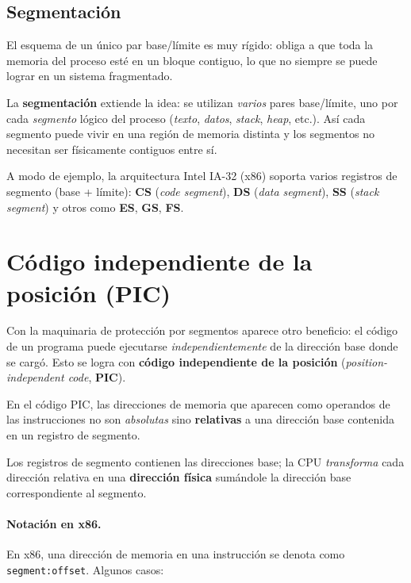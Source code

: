 \documentclass[11pt,a4paper]{article}
\begin{document}
\subsection{Segmentación}

El esquema de un único par base/límite es muy rígido: obliga a que toda
la memoria del proceso esté en un bloque contiguo, lo que no siempre se
puede lograr en un sistema fragmentado.

La \textbf{segmentación} extiende la idea: se utilizan \emph{varios}
pares base/límite, uno por cada \emph{segmento} lógico del proceso
(\emph{texto}, \emph{datos}, \emph{stack}, \emph{heap}, etc.). Así cada
segmento puede vivir en una región de memoria distinta y los segmentos
no necesitan ser físicamente contiguos entre sí.

\begin{idea}
A modo de ejemplo, la arquitectura Intel IA-32 (x86) soporta varios
registros de segmento (base + límite):
\textbf{CS} (\emph{code segment}), \textbf{DS} (\emph{data segment}),
\textbf{SS} (\emph{stack segment}) y otros como \textbf{ES}, \textbf{GS},
\textbf{FS}.
\end{idea}

\section{Código independiente de la posición (PIC)}

Con la maquinaria de protección por segmentos aparece otro beneficio:
el código de un programa puede ejecutarse \emph{independientemente} de
la dirección base donde se cargó. Esto se logra con
\textbf{código independiente de la posición} (\emph{position-independent
code}, \textbf{PIC}).

\begin{definicion}
En el código PIC, las direcciones de memoria que aparecen como
operandos de las instrucciones no son \emph{absolutas} sino
\textbf{relativas} a una dirección base contenida en un registro de
segmento.
\end{definicion}

Los registros de segmento contienen las direcciones base; la CPU
\emph{transforma} cada dirección relativa en una \textbf{dirección
física} sumándole la dirección base correspondiente al segmento.

\paragraph{Notación en x86.}
En x86, una dirección de memoria en una instrucción se denota como
\texttt{segment:offset}. Algunos casos:
\end{document}
